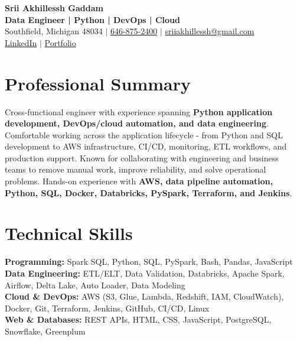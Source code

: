 \documentclass[letterpaper,10pt]{article}
\begin{document}
\fontsize{9.35pt}{10.45pt}\selectfont

\begin{center}
    {\LARGE \textbf{Srii Akhillessh Gaddam}} \\[-1pt]
    \textbf{Data Engineer | Python | DevOps | Cloud} \\[2pt]
    Southfield, Michigan 48034 $|$
    \href{tel:6468752400}{646-875-2400} $|$
    \href{mailto:sriiakhillessh@gmail.com}{sriiakhillessh@gmail.com} \\[1pt]
    \href{https://www.linkedin.com/in/srii-akhiilessh-gaddam-b48668191/}{LinkedIn} $|$
    \href{https://sriiakhillesshg.github.io/portfolio/}{Portfolio}
\end{center}
\vspace{-8pt}

\section{Professional Summary}
\small{Cross-functional engineer with experience spanning \textbf{Python application development, DevOps/cloud automation, and data engineering}. Comfortable working across the application lifecycle - from Python and SQL development to AWS infrastructure, CI/CD, monitoring, ETL workflows, and production support. Known for collaborating with engineering and business teams to remove manual work, improve reliability, and solve operational problems. Hands-on experience with \textbf{AWS, data pipeline automation, Python, SQL, Docker, Databricks, PySpark, Terraform, and Jenkins}.}

\section{Technical Skills}
\small{
\textbf{Programming:} Spark SQL, Python, SQL, PySpark, Bash, Pandas, JavaScript \\
\textbf{Data Engineering:} ETL/ELT, Data Validation, Databricks, Apache Spark, Airflow, Delta Lake, Auto Loader, Data Modeling \\
\textbf{Cloud \& DevOps:} AWS (S3, Glue, Lambda, Redshift, IAM, CloudWatch), Docker, Git, Terraform, Jenkins, GitHub, CI/CD, Linux \\
\textbf{Web \& Databases:} REST APIs, HTML, CSS, JavaScript, PostgreSQL, Snowflake, Greenplum
}

\end{document}

